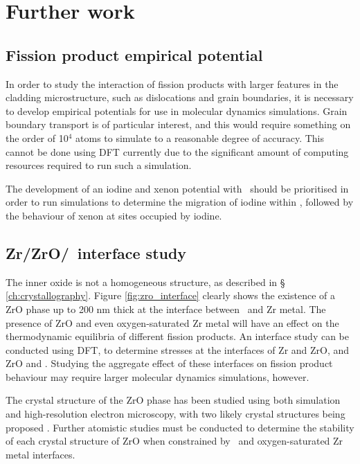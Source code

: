 \section{Further work}

\subsection{Fission product empirical potential}

In order to study the interaction of fission products with larger features in the cladding microstructure, such as dislocations and grain boundaries, it is necessary to develop empirical potentials for use in molecular dynamics simulations. Grain boundary transport is of particular interest, and this would require something on the order of 10$^{4}$ atoms to simulate to a reasonable degree of accuracy. This cannot be done using DFT currently due to the significant amount of computing resources required to run such a simulation. 

The development of an iodine and xenon potential with \zirconia\ should be prioritised in order to run simulations to determine the migration of iodine within \zirconia, followed by the behaviour of xenon at sites occupied by iodine.

\subsection{Zr/ZrO/\zirconia\ interface study}

The inner oxide is not a homogeneous structure, as described in § \ref{ch:crystallography}. Figure \ref{fig:zro_interface} clearly shows the existence of a ZrO phase up to 200 nm thick at the interface between \zirconia\ and Zr metal. The presence of ZrO and even oxygen-saturated Zr metal will have an effect on the thermodynamic equilibria of different fission products. An interface study can be conducted using DFT, to determine stresses at the interfaces of Zr and ZrO, and ZrO and \zirconia . Studying the aggregate effect of these interfaces on fission product behaviour may require larger molecular dynamics simulations, however. 

The crystal structure of the ZrO phase has been studied using both simulation and high-resolution electron microscopy, with two likely crystal structures being proposed \cite{Nicholls2015}. Further atomistic studies must be conducted to determine the stability of each crystal structure of ZrO when constrained by \zirconia\ and oxygen-saturated Zr metal interfaces.

